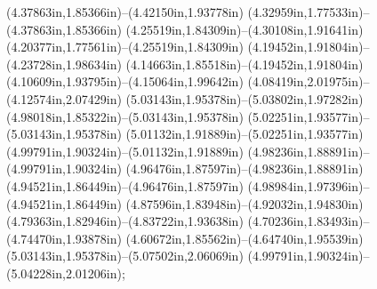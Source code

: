 (4.37863in,1.85366in)--(4.42150in,1.93778in) (4.32959in,1.77533in)--(4.37863in,1.85366in) (4.25519in,1.84309in)--(4.30108in,1.91641in) (4.20377in,1.77561in)--(4.25519in,1.84309in) (4.19452in,1.91804in)--(4.23728in,1.98634in) (4.14663in,1.85518in)--(4.19452in,1.91804in) (4.10609in,1.93795in)--(4.15064in,1.99642in) (4.08419in,2.01975in)--(4.12574in,2.07429in) (5.03143in,1.95378in)--(5.03802in,1.97282in) (4.98018in,1.85322in)--(5.03143in,1.95378in) (5.02251in,1.93577in)--(5.03143in,1.95378in) (5.01132in,1.91889in)--(5.02251in,1.93577in) (4.99791in,1.90324in)--(5.01132in,1.91889in) (4.98236in,1.88891in)--(4.99791in,1.90324in) (4.96476in,1.87597in)--(4.98236in,1.88891in) (4.94521in,1.86449in)--(4.96476in,1.87597in) (4.98984in,1.97396in)--(4.94521in,1.86449in) (4.87596in,1.83948in)--(4.92032in,1.94830in) (4.79363in,1.82946in)--(4.83722in,1.93638in) (4.70236in,1.83493in)--(4.74470in,1.93878in) (4.60672in,1.85562in)--(4.64740in,1.95539in) (5.03143in,1.95378in)--(5.07502in,2.06069in) (4.99791in,1.90324in)--(5.04228in,2.01206in);
